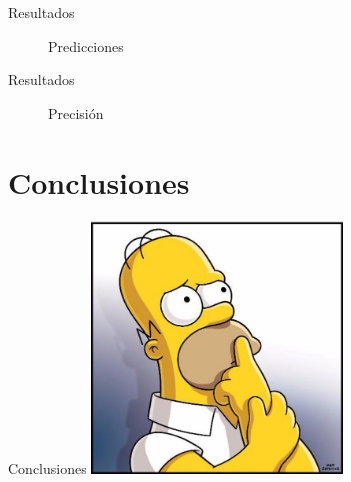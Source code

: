 \documentclass[11pt]{beamer}
\begin{document}
\begin{frame}{Resultados}
    \begin{figure}
    \centering
    \qquad
    \caption{Predicciones}%
    \label{fig:example}%
    \end{figure}
\end{frame}

\begin{frame}{Resultados}
    \begin{figure}
    \centering
    \qquad
    \caption{Precisión}%
    \label{fig:example}%
    \end{figure}
\end{frame}

\section{Conclusiones}
\begin{frame}{Conclusiones}
\centering
    \includegraphics[width=0.5\textwidth]{imagenes/homero.jpg}
\end{frame}
	
\end{document}
